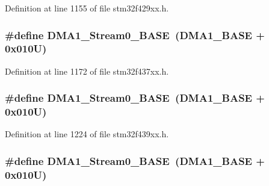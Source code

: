 Definition at line 1155 of file stm32f429xx.\+h.

\subsubsection[{\texorpdfstring{D\+M\+A1\+\_\+\+Stream0\+\_\+\+B\+A\+SE}{DMA1_Stream0_BASE}}]{\setlength{\rightskip}{0pt plus 5cm}\#define D\+M\+A1\+\_\+\+Stream0\+\_\+\+B\+A\+SE~({\bf D\+M\+A1\+\_\+\+B\+A\+SE} + 0x010\+U)}\hypertarget{group___peripheral__memory__map_ga0d3c52aa35dcc68f78b704dfde57ba95}{}\label{group___peripheral__memory__map_ga0d3c52aa35dcc68f78b704dfde57ba95}


Definition at line 1172 of file stm32f437xx.\+h.

\subsubsection[{\texorpdfstring{D\+M\+A1\+\_\+\+Stream0\+\_\+\+B\+A\+SE}{DMA1_Stream0_BASE}}]{\setlength{\rightskip}{0pt plus 5cm}\#define D\+M\+A1\+\_\+\+Stream0\+\_\+\+B\+A\+SE~({\bf D\+M\+A1\+\_\+\+B\+A\+SE} + 0x010\+U)}\hypertarget{group___peripheral__memory__map_ga0d3c52aa35dcc68f78b704dfde57ba95}{}\label{group___peripheral__memory__map_ga0d3c52aa35dcc68f78b704dfde57ba95}


Definition at line 1224 of file stm32f439xx.\+h.

\subsubsection[{\texorpdfstring{D\+M\+A1\+\_\+\+Stream0\+\_\+\+B\+A\+SE}{DMA1_Stream0_BASE}}]{\setlength{\rightskip}{0pt plus 5cm}\#define D\+M\+A1\+\_\+\+Stream0\+\_\+\+B\+A\+SE~({\bf D\+M\+A1\+\_\+\+B\+A\+SE} + 0x010\+U)}\hypertarget{group___peripheral__memory__map_ga0d3c52aa35dcc68f78b704dfde57ba95}{}\label{group___peripheral__memory__map_ga0d3c52aa35dcc68f78b704dfde57ba95}


